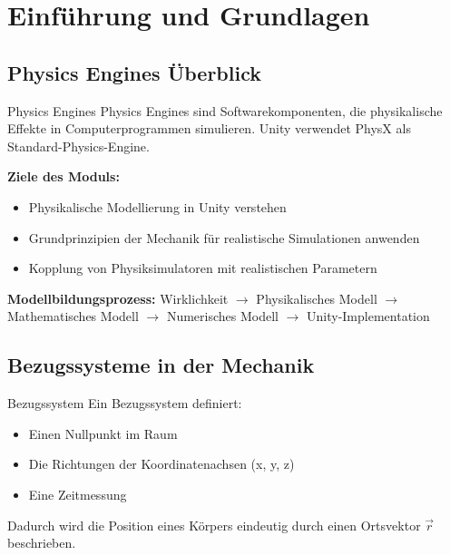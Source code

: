 \section{Einführung und Grundlagen}

\subsection{Physics Engines Überblick}
\begin{concept}{Physics Engines}
    Physics Engines sind Softwarekomponenten, die physikalische Effekte in Computerprogrammen simulieren. Unity verwendet PhysX als Standard-Physics-Engine.
    
    \textbf{Ziele des Moduls:}
    \begin{itemize}
        \item Physikalische Modellierung in Unity verstehen
        \item Grundprinzipien der Mechanik für realistische Simulationen anwenden
        \item Kopplung von Physiksimulatoren mit realistischen Parametern
    \end{itemize}
\end{concept}

\begin{remark}
    \textbf{Modellbildungsprozess:}
    Wirklichkeit $\rightarrow$ Physikalisches Modell $\rightarrow$ Mathematisches Modell $\rightarrow$ Numerisches Modell $\rightarrow$ Unity-Implementation
\end{remark}

\subsection{Bezugssysteme in der Mechanik}
\begin{definition}{Bezugssystem}
    Ein Bezugssystem definiert:
    \begin{itemize}
        \item Einen Nullpunkt im Raum
        \item Die Richtungen der Koordinatenachsen (x, y, z)
        \item Eine Zeitmessung
    \end{itemize}
    Dadurch wird die Position eines Körpers eindeutig durch einen Ortsvektor $\vec{r}$ beschrieben.
\end{definition}

